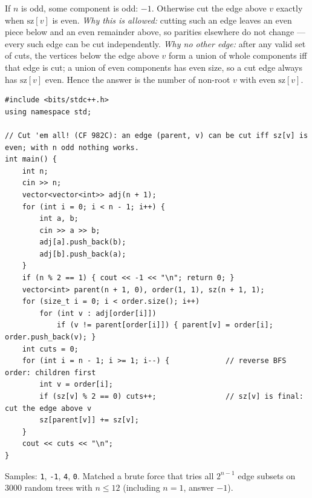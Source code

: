 \begin{solutionbox}
If $n$ is odd, some component is odd: $-1$. Otherwise cut the edge above $v$ exactly when $\mathrm{sz}[v]$ is even. \emph{Why this is allowed:} cutting such an edge leaves an even piece below and an even remainder above, so parities elsewhere do not change --- every such edge can be cut independently. \emph{Why no other edge:} after any valid set of cuts, the vertices below the edge above $v$ form a union of whole components iff that edge is cut; a union of even components has even size, so a cut edge always has $\mathrm{sz}[v]$ even. Hence the answer is the number of non-root $v$ with even $\mathrm{sz}[v]$.
\begin{center}
\end{center}
\begin{lstlisting}[style=cpp]
#include <bits/stdc++.h>
using namespace std;

// Cut 'em all! (CF 982C): an edge (parent, v) can be cut iff sz[v] is even; with n odd nothing works.
int main() {
    int n;
    cin >> n;
    vector<vector<int>> adj(n + 1);
    for (int i = 0; i < n - 1; i++) {
        int a, b;
        cin >> a >> b;
        adj[a].push_back(b);
        adj[b].push_back(a);
    }
    if (n % 2 == 1) { cout << -1 << "\n"; return 0; }
    vector<int> parent(n + 1, 0), order(1, 1), sz(n + 1, 1);
    for (size_t i = 0; i < order.size(); i++)
        for (int v : adj[order[i]])
            if (v != parent[order[i]]) { parent[v] = order[i]; order.push_back(v); }
    int cuts = 0;
    for (int i = n - 1; i >= 1; i--) {             // reverse BFS order: children first
        int v = order[i];
        if (sz[v] % 2 == 0) cuts++;                // sz[v] is final: cut the edge above v
        sz[parent[v]] += sz[v];
    }
    cout << cuts << "\n";
}
\end{lstlisting}
Samples: \texttt{1}, \texttt{-1}, \texttt{4}, \texttt{0}. Matched a brute force that tries all $2^{n-1}$ edge subsets on $3000$ random trees with $n \le 12$ (including $n = 1$, answer $-1$).
\end{solutionbox}

